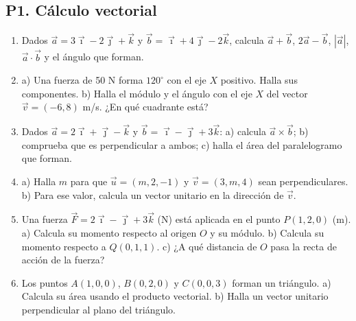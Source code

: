 \documentclass[11pt,a4paper]{article}
\newcommand{\ii}{\vec{\imath}}
\newcommand{\jj}{\vec{\jmath}}
\newcommand{\kk}{\vec{k}}
\begin{document}
\newcommand{\prob}[1]{\item[\textbf{#1}]}

\subsection*{P1. Cálculo vectorial}
\begin{enumerate}[leftmargin=1.4cm,itemsep=5pt]
\prob{1.1 $\star$} Dados $\vec a=3\ii-2\jj+\kk$ y $\vec b=\ii+4\jj-2\kk$, calcula $\vec a+\vec b$, $2\vec a-\vec b$, $|\vec a|$, $\vec a\cdot\vec b$ y el ángulo que forman.
\prob{1.2 $\star$} a) Una fuerza de 50 N forma $120^\circ$ con el eje $X$ positivo. Halla sus componentes. b) Halla el módulo y el ángulo con el eje $X$ del vector $\vec v=(-6,8)$ m/s. ¿En qué cuadrante está?
\prob{1.3 $\star\star$} Dados $\vec a=2\ii+\jj-\kk$ y $\vec b=\ii-\jj+3\kk$: a) calcula $\vec a\times\vec b$; b) comprueba que es perpendicular a ambos; c) halla el área del paralelogramo que forman.
\prob{1.4 $\star\star$} a) Halla $m$ para que $\vec u=(m,2,-1)$ y $\vec v=(3,m,4)$ sean perpendiculares. b) Para ese valor, calcula un vector unitario en la dirección de $\vec v$.
\prob{1.5 $\star\star\star$} Una fuerza $\vec F=2\ii-\jj+3\kk$ (N) está aplicada en el punto $P(1,2,0)$ (m). a) Calcula su momento respecto al origen $O$ y su módulo. b) Calcula su momento respecto a $Q(0,1,1)$. c) ¿A qué distancia de $O$ pasa la recta de acción de la fuerza?
\prob{1.6 $\star\star\star$} Los puntos $A(1,0,0)$, $B(0,2,0)$ y $C(0,0,3)$ forman un triángulo. a) Calcula su área usando el producto vectorial. b) Halla un vector unitario perpendicular al plano del triángulo.
\end{enumerate}
\end{document}
